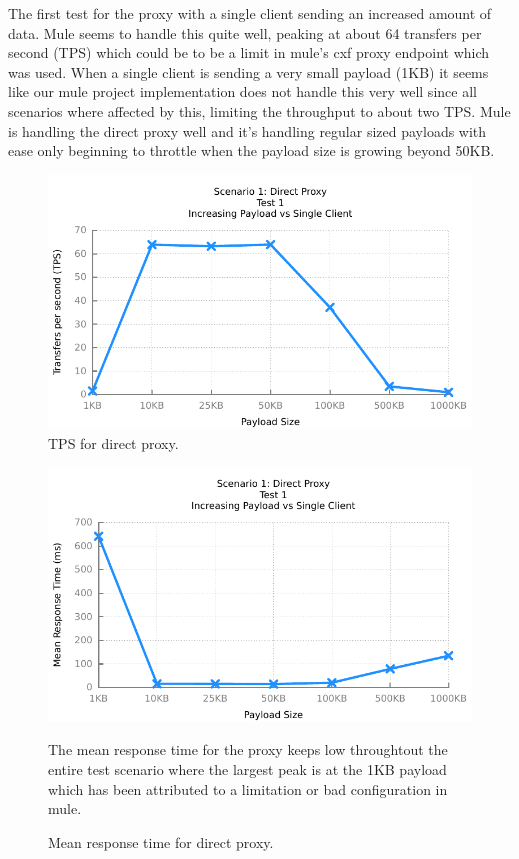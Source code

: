 The first test for the proxy with a single client sending an increased amount of data. Mule seems to handle this quite well, peaking at about 64 transfers per second (TPS) which could be to be a limit in mule's cxf proxy endpoint which was used. When a single client is sending a very small payload (1KB) it seems like our mule project implementation does not handle this very well since all scenarios where affected by this, limiting the throughput to about two TPS. Mule is handling the direct proxy well and it's handling regular sized payloads with ease only beginning to throttle when the payload size is growing beyond 50KB.

\begin{figure}[H]
	\caption{TPS for direct proxy.}
	\centerline{\includegraphics{img/proxy_fu_ip_tps}}
	\label{fig:proxy-1-1}
\end{figure}


\begin{figure}[H]
	\caption{Mean response time for direct proxy.}
	\centerline{\includegraphics{img/proxy_fu_ip_resp}}
	\label{fig:proxy-1-2}
	The mean response time for the proxy keeps low throughtout the entire test scenario where the largest peak is at the 1KB payload which has been attributed to a limitation or bad configuration in mule.
\end{figure}



